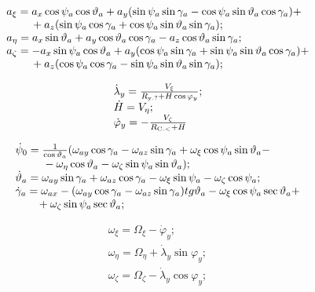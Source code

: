 \[\begin{array}{l} {a_{\xi } =a_{x} \cos \psi_{a} \cos \vartheta_{a} +a_{y} (\sin 
\psi_{a} \sin \gamma_{a} -\cos \psi_{a} \sin \vartheta_{a} \cos \gamma_{a} )+} 
\\ {{\rm \; \; \; \; \; \; \; \; }+a_{z} (\sin \psi_{a} \cos \gamma_{a} +\cos \psi 
_{a} \sin \vartheta_{a} \sin \gamma_{a} );} \\ {a_{\eta } =a_{x} \sin \vartheta 
_{a} +a_{y} \cos \vartheta_{a} \cos \gamma_{a} -a_{z} \cos \vartheta_{a} \sin 
\gamma_{a} ;} \\ {a_{\zeta } =-a_{x} \sin \psi_{a} \cos \vartheta_{a} +a_{y} (
\cos \psi_{a} \sin \gamma_{a} +\sin \psi_{a} \sin \vartheta_{a} \cos \gamma_{a} 
)+} \\ {{\rm \; \; \; \; \; \; \; \; }+a_{z} (\cos \psi_{a} \cos \gamma_{a} -\sin 
\psi_{a} \sin \vartheta_{a} \sin \gamma_{a} );} \end{array}\] 

\[\begin{array}{l} {\dot{\lambda }_{y} =\frac{V_{\xi } }{R_{{\rm y.?}} +H\cos \varphi 
_{y} } ;} \\ {\dot{H}=V_{\eta } ;} \\ {\dot{\varphi }_{y} =-\frac{V_{\zeta } }{R_{{
\rm C.<}} +H} } \end{array}\] 

\[\begin{array}{l} {\dot{\psi }_{0} =\frac{1}{\cos \vartheta_{a} } (\omega_{ay} 
\cos \gamma_{a} -\omega_{az} \sin \gamma_{a} +\omega_{\xi } \cos \psi_{a} \sin 
\vartheta_{a} -} \\ {{\rm \; \; \; \; \; \; \; \; \; }-\omega_{\eta } \cos \vartheta 
_{a} -\omega_{\zeta } \sin \psi_{a} \sin \vartheta_{a} );} \\ {\dot{\vartheta 
}_{a} =\omega_{ay} \sin \gamma_{a} +\omega_{az} \cos \gamma_{a} -\omega_{\xi 
} \sin \psi_{a} -\omega_{\zeta } \cos \psi_{a} ;} \\ {\dot{\gamma }_{a} =\omega 
_{ax} -(\omega_{ay} \cos \gamma_{a} -\omega_{az} \sin \gamma_{a} )tg\vartheta 
_{a} -\omega_{\xi } \cos \psi_{a} \sec \vartheta_{a} +} \\ {{\rm \; \; \; \; \; 
\; \; }+\omega_{\zeta } \sin \psi_{a} \sec \vartheta_{a} ;} \end{array}\] 

\[\begin{array}{l} {\omega_{\xi } =\Omega_{\xi } -\dot{\varphi }_{y} ;} \\ {\omega 
_{\eta } =\Omega_{\eta } +\dot{\lambda }_{y} \sin \varphi_{y} ;} \\ {\omega_{
\zeta } =\Omega_{\zeta } -\dot{\lambda }_{y} \cos \varphi_{y} ;} \end{array}\] 

